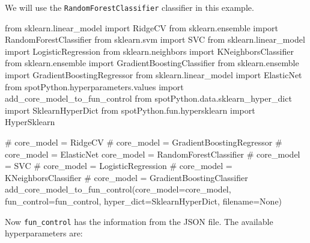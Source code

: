 \documentclass[
  letterpaper,
  DIV=11,
  numbers=noendperiod]{scrreprt}
\newenvironment{Shaded}{\begin{snugshade}}{\end{snugshade}}
\newcommand{\CommentTok}[1]{\textcolor[rgb]{0.37,0.37,0.37}{#1}}
\newcommand{\ImportTok}[1]{\textcolor[rgb]{0.00,0.46,0.62}{#1}}
\newcommand{\NormalTok}[1]{\textcolor[rgb]{0.00,0.23,0.31}{#1}}
\newcommand{\OperatorTok}[1]{\textcolor[rgb]{0.37,0.37,0.37}{#1}}
\newcommand{\VariableTok}[1]{\textcolor[rgb]{0.07,0.07,0.07}{#1}}
\begin{document}
We will use the \texttt{RandomForestClassifier} classifier in this
example.

\begin{Shaded}
\begin{Highlighting}[]
\ImportTok{from}\NormalTok{ sklearn.linear\_model }\ImportTok{import}\NormalTok{ RidgeCV}
\ImportTok{from}\NormalTok{ sklearn.ensemble }\ImportTok{import}\NormalTok{ RandomForestClassifier}
\ImportTok{from}\NormalTok{ sklearn.svm }\ImportTok{import}\NormalTok{ SVC}
\ImportTok{from}\NormalTok{ sklearn.linear\_model }\ImportTok{import}\NormalTok{ LogisticRegression}
\ImportTok{from}\NormalTok{ sklearn.neighbors }\ImportTok{import}\NormalTok{ KNeighborsClassifier}
\ImportTok{from}\NormalTok{ sklearn.ensemble }\ImportTok{import}\NormalTok{ GradientBoostingClassifier}
\ImportTok{from}\NormalTok{ sklearn.ensemble }\ImportTok{import}\NormalTok{ GradientBoostingRegressor}
\ImportTok{from}\NormalTok{ sklearn.linear\_model }\ImportTok{import}\NormalTok{ ElasticNet}
\ImportTok{from}\NormalTok{ spotPython.hyperparameters.values }\ImportTok{import}\NormalTok{ add\_core\_model\_to\_fun\_control}
\ImportTok{from}\NormalTok{ spotPython.data.sklearn\_hyper\_dict }\ImportTok{import}\NormalTok{ SklearnHyperDict}
\ImportTok{from}\NormalTok{ spotPython.fun.hypersklearn }\ImportTok{import}\NormalTok{ HyperSklearn}
\end{Highlighting}
\end{Shaded}

\begin{Shaded}
\begin{Highlighting}[]
\CommentTok{\# core\_model  = RidgeCV}
\CommentTok{\# core\_model = GradientBoostingRegressor}
\CommentTok{\# core\_model = ElasticNet}
\NormalTok{core\_model }\OperatorTok{=}\NormalTok{ RandomForestClassifier}
\CommentTok{\# core\_model = SVC}
\CommentTok{\# core\_model = LogisticRegression}
\CommentTok{\# core\_model = KNeighborsClassifier}
\CommentTok{\# core\_model = GradientBoostingClassifier}
\NormalTok{add\_core\_model\_to\_fun\_control(core\_model}\OperatorTok{=}\NormalTok{core\_model,}
\NormalTok{                              fun\_control}\OperatorTok{=}\NormalTok{fun\_control,}
\NormalTok{                              hyper\_dict}\OperatorTok{=}\NormalTok{SklearnHyperDict,}
\NormalTok{                              filename}\OperatorTok{=}\VariableTok{None}\NormalTok{)}
\end{Highlighting}
\end{Shaded}

Now \texttt{fun\_control} has the information from the JSON file. The
available hyperparameters are:
\end{document}
